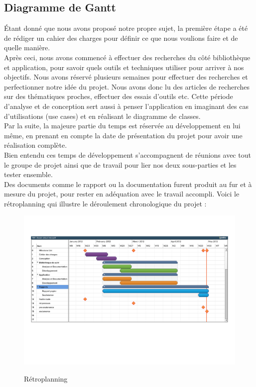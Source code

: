 \documentclass{report}
\begin{document}
			\subsection{Diagramme de Gantt}
			Étant donné que nous avons proposé notre propre sujet, la première étape a été de rédiger un cahier des charges pour définir ce que nous voulions faire et de quelle manière. \\
			Après ceci, nous avons commencé à effectuer des recherches du côté bibliothèque et application, pour savoir quels outils et techniques utiliser pour arriver à nos objectifs. 
		  Nous avons réservé plusieurs semaines pour effectuer des recherches et perfectionner notre idée du projet. Nous avons donc lu des articles de recherches sur des thématiques proches, effectuer des essais d'outils etc. Cette période d'analyse et de conception sert aussi à penser l'application en imaginant des cas d'utilisations (use cases) et en réalisant le diagramme de classes. \\
			
			Par la suite, la majeure partie du temps est réservée au développement en lui même, en prenant en compte la date de présentation du projet pour avoir une réalisation complète. \\  
			Bien entendu ces temps de développement s'accompagnent de réunions avec tout le groupe de projet ainsi que de travail pour lier nos deux sous-parties et les tester ensemble. \\
			Des documents comme le rapport ou la documentation furent produit au fur et à mesure du projet, pour rester en adéquation avec le travail accompli. Voici le rétroplanning qui illustre le déroulement chronologique du projet : \\
				\begin{figure}[!h]
					\centering
					\includegraphics[scale=0.6]{../images/retro-planning.pdf}\\
					\caption{Rétroplanning}
					\label{Rétroplanning}
				\end{figure}
		\newpage
\end{document}
